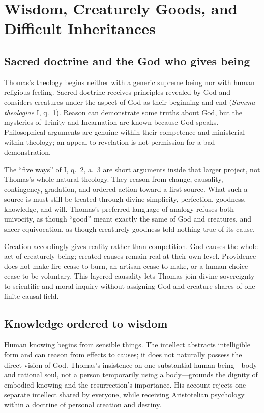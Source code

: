 \section{Wisdom, Creaturely Goods, and Difficult Inheritances}

\subsection{Sacred doctrine and the God who gives being}

Thomas's theology begins neither with a generic supreme being nor with human
religious feeling.  Sacred doctrine receives principles revealed by God and
considers creatures under the aspect of God as their beginning and end
(\emph{Summa theologiae} I, q.~1).  Reason can demonstrate some truths about
God, but the mysteries of Trinity and Incarnation are known because God speaks.
Philosophical arguments are genuine within their competence and ministerial
within theology; an appeal to revelation is not permission for a bad
demonstration.

The ``five ways'' of I, q.~2, a.~3 are short arguments inside that larger
project, not Thomas's whole natural theology.  They reason from change,
causality, contingency, gradation, and ordered action toward a first source.
What such a source is must still be treated through divine simplicity,
perfection, goodness, knowledge, and will.  Thomas's preferred language of
analogy refuses both univocity, as though ``good'' meant exactly the same of
God and creatures, and sheer equivocation, as though creaturely goodness told
nothing true of its cause.

Creation accordingly gives reality rather than competition.  God causes the
whole act of creaturely being; created causes remain real at their own level.
Providence does not make fire cease to burn, an artisan cease to make, or a
human choice cease to be voluntary.  This layered causality lets Thomas join
divine sovereignty to scientific and moral inquiry without assigning God and
creature shares of one finite causal field.

\subsection{Knowledge ordered to wisdom}

Human knowing begins from sensible things.  The intellect abstracts
intelligible form and can reason from effects to causes; it does not naturally
possess the direct vision of God.  Thomas's insistence on one substantial human
being---body and rational soul, not a person temporarily using a body---grounds
the dignity of embodied knowing and the resurrection's importance.  His
account rejects one separate intellect shared by everyone, while receiving
Aristotelian psychology within a doctrine of personal creation and destiny.

